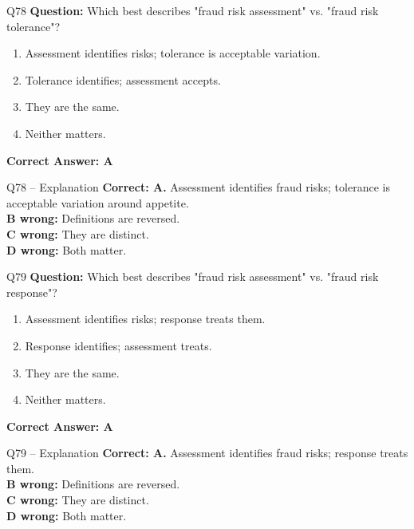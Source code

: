 \documentclass[aspectratio=169,10pt]{beamer}
\begin{document}
	\begin{frame}[t]{Q78}
		\small
		\textbf{Question:} Which best describes "fraud risk assessment" vs. "fraud risk tolerance"?
		\begin{enumerate}[label=\Alph*.,itemsep=1pt,topsep=2pt]
			\item Assessment identifies risks; tolerance is acceptable variation.
			\item Tolerance identifies; assessment accepts.
			\item They are the same.
			\item Neither matters.
		\end{enumerate}
		\vspace{4pt}
		\textbf{Correct Answer: A}
	\end{frame}
	
	\begin{frame}[t]{Q78 -- Explanation}
		\small
		\textbf{Correct: A.} Assessment identifies fraud risks; tolerance is acceptable variation around appetite. \\[4pt]
		\textbf{B wrong:} Definitions are reversed. \\[2pt]
		\textbf{C wrong:} They are distinct. \\[2pt]
		\textbf{D wrong:} Both matter.
	\end{frame}
	
	\begin{frame}[t]{Q79}
		\small
		\textbf{Question:} Which best describes "fraud risk assessment" vs. "fraud risk response"?
		\begin{enumerate}[label=\Alph*.,itemsep=1pt,topsep=2pt]
			\item Assessment identifies risks; response treats them.
			\item Response identifies; assessment treats.
			\item They are the same.
			\item Neither matters.
		\end{enumerate}
		\vspace{4pt}
		\textbf{Correct Answer: A}
	\end{frame}
	
	\begin{frame}[t]{Q79 -- Explanation}
		\small
		\textbf{Correct: A.} Assessment identifies fraud risks; response treats them. \\[4pt]
		\textbf{B wrong:} Definitions are reversed. \\[2pt]
		\textbf{C wrong:} They are distinct. \\[2pt]
		\textbf{D wrong:} Both matter.
	\end{frame}
	
\end{document}
